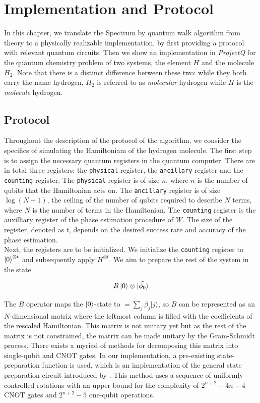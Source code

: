 \chapter{Implementation and Protocol}


In this chapter, we translate the Spectrum by quantum walk algorithm from theory to a physically realizable implementation, by first providing a protocol with relevant quantum circuits. Then we show an implementation in \textit{ProjectQ} for the quantum chemistry problem of two systems, the element $H$ and the molecule $H_2$. Note that there is a distinct difference between these two: while they both carry the name hydrogen, $H_2$ is referred to as \textit{molecular} hydrogen while $H$ is the \textit{molecule} hydrogen.

\section{Protocol}

Throughout the description of the protocol of the algorithm, we consider the specifics of simulating the Hamiltoniam  of the hydrogen molecule. The first step is to assign the necessary quantum registers in the quantum computer. There are in total three registers: the \verb|physical| register, the \verb|ancillary| register and the \verb|counting| register. The \verb|physical| register is of size $n$, where $n$ is the number of qubits that the Hamiltonian acts on. The \verb|ancillary| register is of size $\log(N+1)$, the ceiling of the number of qubits required to describe $N$ terms, where $N$ is the number of terms in the Hamiltonian. The \verb|counting| register is the auxilliary register of the phase estimation procedure of $W$. The size of the register, denoted as $t$, depends on the desired success rate and accuracy of the phase estimation.\\

Next, the registers are to be initialized. We initialize the \verb|counting| register to $\left\vert{0}\right\rangle^{\otimes t}$ and subsequently apply $H^{\otimes t}$. We aim to prepare the rest of the system in the state

$$
B \left\vert{0}\right\rangle \otimes \tilde{\left\vert{\phi_0}\right\rangle}
$$

The $B$ operator maps the $\left\vert{0}\right\rangle$-state to $
=\sum_{j} \beta_{j}|j\rangle
$, so $B$ can be represented as an $N$-dimensional matrix where the leftmost column is filled with the coefficients of the rescaled Hamiltonian. This matrix is not unitary yet but as the rest of the matrix is not constrained, the matrix can be made unitary by the Gram-Schmidt process. There exists a myriad of methods for decomposing this matrix into single-qubit and CNOT gates. In our implementation, a pre-existing state-preparation function is used, which is an implementation of the general state preparation circuit introduced by \textcite{trans}. This method uses a sequence of uniformly controlled rotations with an upper bound for the complexity of \(2^{n+2}-4 n-4\) CNOT gates and \(2^{n+2}-5\) one-qubit operations.\\

